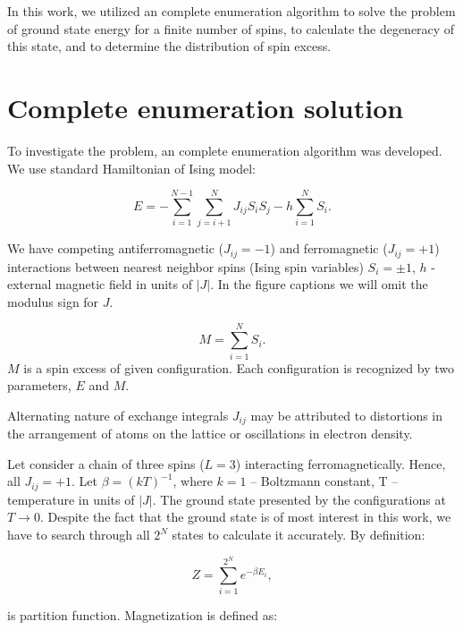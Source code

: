 \documentclass[preprint,12pt]{elsarticle}
\begin{document}
	In this work, we utilized an complete enumeration algorithm \cite{dias2023ground, padalko2021parallel} to solve the problem of ground state energy for a finite number of spins, to calculate the degeneracy of this state, and to determine the distribution of spin excess.
	
	\section{Complete enumeration solution}
	
	To investigate the problem, an complete enumeration algorithm was developed. We use standard Hamiltonian of Ising model:
	
	\begin{equation}
		E = -\sum^{N - 1}_{i=1}\sum^N_{j = i + 1} J_{ij} S_i S_j - h \sum^N_{i=1} S_i.
		\label{eq:ising_energy}
	\end{equation}
	
	We have competing antiferromagnetic ($J_{ij} = -1$) and ferromagnetic ($J_{ij} = +1$) interactions between nearest neighbor spins (Ising spin variables) $S_i = \pm1$, $h$ - external magnetic field in units of $|J|$. In the figure captions we will omit the modulus sign for $J$.
	
	\begin{equation}
		M = \sum^N_{i=1} S_i.
		\label{eq:spin_excess} 
	\end{equation}
	$M$ is a spin excess of given configuration. Each configuration is recognized by two parameters, $E$ and $M$.
	
	
	Alternating nature of exchange integrals $J_{ij}$ may be attributed to distortions in the arrangement of atoms on the lattice or oscillations in electron density.
	
	Let consider a chain of three spins ($L = 3$) interacting ferromagnetically. Hence, all $J_{ij} = +1$. Let $\beta = (kT)^{-1}$, where $k = 1$ -- Boltzmann constant, T -- temperature in units of $|J|$. The ground state presented by the configurations at $T \rightarrow 0$. Despite the fact that the ground state is of most interest in this work, we have to search through all $2^N$ states to calculate it accurately. By definition:
	
		\begin{equation}
		Z = \sum_{i = 1}^{2 ^ N} e^{-\beta E_i},
		\label{eq:stat_difinition}
	\end{equation}
	
	\noindent is partition function. Magnetization is defined as: 
	
\end{document}
